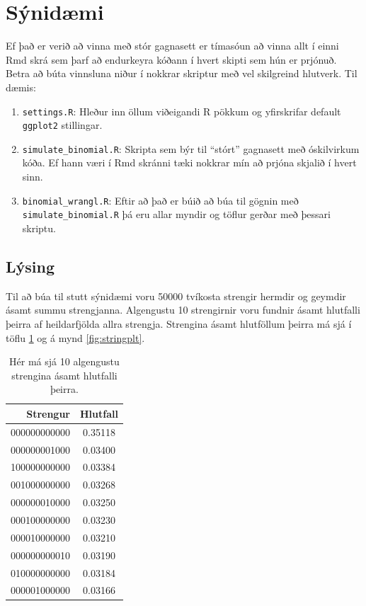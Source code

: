 \documentclass[10pt,]{article}
\begin{document}
\hypertarget{suxfdniduxe6mi}{%
\section{Sýnidæmi}\label{suxfdniduxe6mi}}

Ef það er verið að vinna með stór gagnasett er tímasóun að vinna allt í einni Rmd skrá sem þarf að endurkeyra kóðann í hvert skipti sem hún er prjónuð. Betra að búta vinnsluna niður í nokkrar skriptur með vel skilgreind hlutverk. Til dæmis:

\begin{enumerate}
\def\labelenumi{\arabic{enumi}.}
\item
  \texttt{settings.R}: Hleður inn öllum viðeigandi R pökkum og yfirskrifar default \texttt{ggplot2} stillingar.
\item
  \texttt{simulate\_binomial.R}: Skripta sem býr til ``stórt'' gagnasett með óskilvirkum kóða. Ef hann væri í Rmd skránni tæki nokkrar mín að prjóna skjalið í hvert sinn.
\item
  \texttt{binomial\_wrangl.R}: Eftir að það er búið að búa til gögnin með \texttt{simulate\_binomial.R} þá eru allar myndir og töflur gerðar með þessari skriptu.
\end{enumerate}

\hypertarget{luxfdsing}{%
\subsection{Lýsing}\label{luxfdsing}}

Til að búa til stutt sýnidæmi voru 50000 tvíkosta strengir hermdir og geymdir ásamt summu strengjanna. Algengustu 10 strengirnir voru fundnir ásamt hlutfalli þeirra af heildarfjölda allra strengja. Strengina ásamt hlutföllum þeirra má sjá í töflu \ref{tab:strings} og á mynd \ref{fig:stringplt}.

\begin{table}[!h]

\caption{\label{tab:unnamed-chunk-3}\label{tab:strings} Hér má sjá 10 algengustu strengina ásamt hlutfalli þeirra.}
\centering
\begin{tabular}[t]{rc}
\toprule
\textbf{Strengur} & \textbf{Hlutfall}\\
\midrule
000000000000 & 0.35118\\
000000001000 & 0.03400\\
100000000000 & 0.03384\\
001000000000 & 0.03268\\
000000010000 & 0.03250\\
000100000000 & 0.03230\\
000010000000 & 0.03210\\
000000000010 & 0.03190\\
010000000000 & 0.03184\\
000001000000 & 0.03166\\
\bottomrule
\end{tabular}
\end{table}
\end{document}
